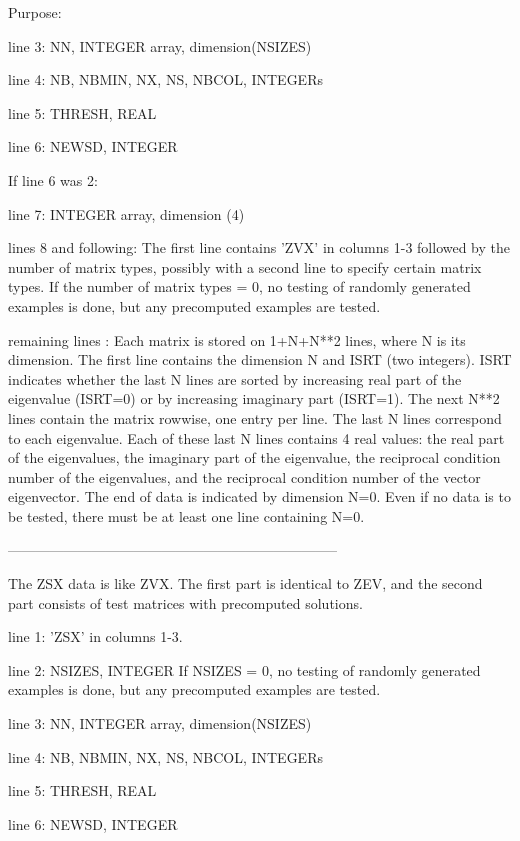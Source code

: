 \begin{DoxyParagraph}{Purpose\+: }
\begin{DoxyVerb}
 line 3:  NN, INTEGER array, dimension(NSIZES)

 line 4:  NB, NBMIN, NX, NS, NBCOL, INTEGERs

 line 5:  THRESH, REAL

 line 6:  NEWSD, INTEGER

 If line 6 was 2:

 line 7:  INTEGER array, dimension (4)

 lines 8 and following: The first line contains 'ZVX' in columns 1-3
          followed by the number of matrix types, possibly with
          a second line to specify certain matrix types.
          If the number of matrix types = 0, no testing of randomly
          generated examples is done, but any precomputed examples
          are tested.

 remaining lines : Each matrix is stored on 1+N+N**2 lines, where N is
          its dimension. The first line contains the dimension N and
          ISRT (two integers). ISRT indicates whether the last N lines
          are sorted by increasing real part of the eigenvalue
          (ISRT=0) or by increasing imaginary part (ISRT=1). The next
          N**2 lines contain the matrix rowwise, one entry per line.
          The last N lines correspond to each eigenvalue. Each of
          these last N lines contains 4 real values: the real part of
          the eigenvalues, the imaginary part of the eigenvalue, the
          reciprocal condition number of the eigenvalues, and the
          reciprocal condition number of the vector eigenvector. The
          end of data is indicated by dimension N=0. Even if no data
          is to be tested, there must be at least one line containing
          N=0.

-----------------------------------------------------------------------

 The ZSX data is like ZVX. The first part is identical to ZEV, and the
 second part consists of test matrices with precomputed solutions.

 line 1:  'ZSX' in columns 1-3.

 line 2:  NSIZES, INTEGER
          If NSIZES = 0, no testing of randomly generated examples
          is done, but any precomputed examples are tested.

 line 3:  NN, INTEGER array, dimension(NSIZES)

 line 4:  NB, NBMIN, NX, NS, NBCOL, INTEGERs

 line 5:  THRESH, REAL

 line 6:  NEWSD, INTEGER


\end{DoxyVerb}
\end{DoxyParagraph}
